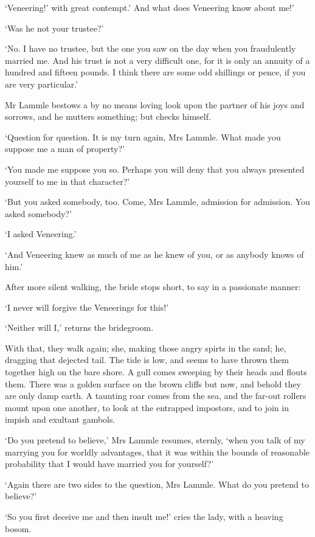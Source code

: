 ‘Veneering!’ with great contempt.’ And what does Veneering know about
me!’

‘Was he not your trustee?’

‘No. I have no trustee, but the one you saw on the day when you
fraudulently married me. And his trust is not a very difficult one, for
it is only an annuity of a hundred and fifteen pounds. I think there are
some odd shillings or pence, if you are very particular.’

Mr Lammle bestows a by no means loving look upon the partner of his joys
and sorrows, and he mutters something; but checks himself.

‘Question for question. It is my turn again, Mrs Lammle. What made you
suppose me a man of property?’

‘You made me suppose you so. Perhaps you will deny that you always
presented yourself to me in that character?’

‘But you asked somebody, too. Come, Mrs Lammle, admission for admission.
You asked somebody?’

‘I asked Veneering.’

‘And Veneering knew as much of me as he knew of you, or as anybody knows
of him.’

After more silent walking, the bride stops short, to say in a passionate
manner:

‘I never will forgive the Veneerings for this!’

‘Neither will I,’ returns the bridegroom.

With that, they walk again; she, making those angry spirts in the sand;
he, dragging that dejected tail. The tide is low, and seems to have
thrown them together high on the bare shore. A gull comes sweeping by
their heads and flouts them. There was a golden surface on the brown
cliffs but now, and behold they are only damp earth. A taunting roar
comes from the sea, and the far-out rollers mount upon one another,
to look at the entrapped impostors, and to join in impish and exultant
gambols.

‘Do you pretend to believe,’ Mrs Lammle resumes, sternly, ‘when you talk
of my marrying you for worldly advantages, that it was within the bounds
of reasonable probability that I would have married you for yourself?’

‘Again there are two sides to the question, Mrs Lammle. What do you
pretend to believe?’

‘So you first deceive me and then insult me!’ cries the lady, with a
heaving bosom.

